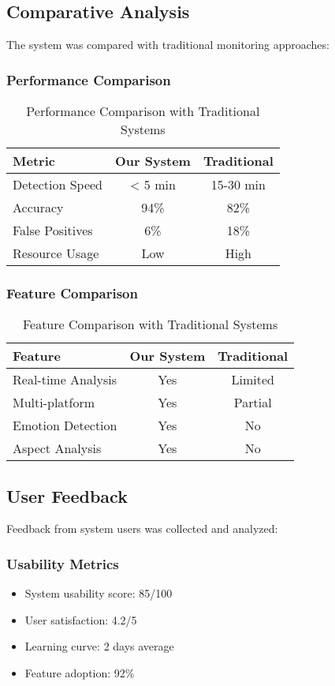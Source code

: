 \subsection{Comparative Analysis}
The system was compared with traditional monitoring approaches:

\subsubsection{Performance Comparison}
\begin{table}[h]
\centering
\begin{tabular}{|l|c|c|}
\hline
\textbf{Metric} & \textbf{Our System} & \textbf{Traditional} \\
\hline
Detection Speed & < 5 min & 15-30 min \\
Accuracy & 94\% & 82\% \\
False Positives & 6\% & 18\% \\
Resource Usage & Low & High \\
\hline
\end{tabular}
\caption{Performance Comparison with Traditional Systems}
\end{table}

\subsubsection{Feature Comparison}
\begin{table}[h]
\centering
\begin{tabular}{|l|c|c|}
\hline
\textbf{Feature} & \textbf{Our System} & \textbf{Traditional} \\
\hline
Real-time Analysis & Yes & Limited \\
Multi-platform & Yes & Partial \\
Emotion Detection & Yes & No \\
Aspect Analysis & Yes & No \\
\hline
\end{tabular}
\caption{Feature Comparison with Traditional Systems}
\end{table}

\subsection{User Feedback}
Feedback from system users was collected and analyzed:

\subsubsection{Usability Metrics}
\begin{itemize}
    \item System usability score: 85/100
    \item User satisfaction: 4.2/5
    \item Learning curve: 2 days average
    \item Feature adoption: 92\%
\end{itemize}

